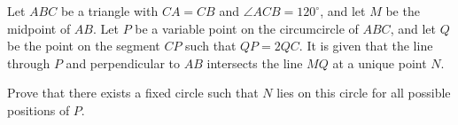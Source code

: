 Let $ABC$ be a triangle with $CA=CB$ and $\angle{ACB}=120^\circ$, and let $M$ be the midpoint of $AB$. Let $P$ be a variable point on the circumcircle of $ABC$, and let $Q$ be the point on the segment $CP$ such that $QP=2QC$. It is given that the line through $P$ and perpendicular to $AB$ intersects the line $MQ$ at a unique point $N$.

Prove that there exists a fixed circle such that $N$ lies on this circle for all possible positions of $P$.